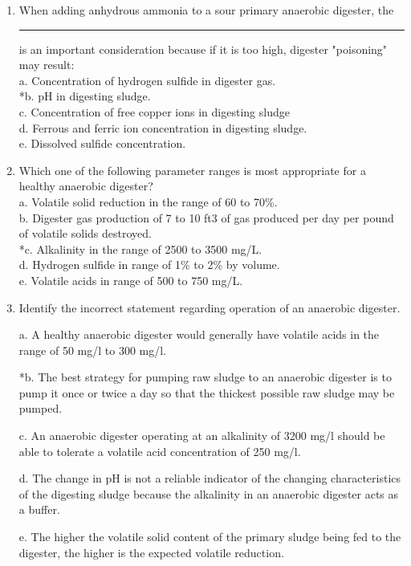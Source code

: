 \begin{enumerate}
\item  When adding anhydrous ammonia to a sour primary anaerobic digester, the\rule{1.5cm}{0.3cm} is an important consideration because if it is too high, digester "poisoning" may result: \\

a. Concentration of hydrogen sulfide in digester gas. \\
*b. pH in digesting sludge. \\
c. Concentration of free copper ions in digesting sludge \\
d. Ferrous and ferric ion concentration in digesting sludge. \\
e. Dissolved sulfide concentration. \\

\item  Which one of the following parameter ranges is most appropriate for a healthy anaerobic digester? \\

a. Volatile solid reduction in the range of 60 to 70\%. \\
b. Digester gas production of 7 to 10 ft3 of gas produced per day per pound of volatile solids destroyed. \\
*c. Alkalinity in the range of 2500 to 3500 mg/L. \\
d. Hydrogen sulfide in range of 1\% to 2\% by volume. \\
e. Volatile acids in range of 500 to 750 mg/L. \\

\item Identify the incorrect statement regarding operation of an anaerobic digester. 

a. A healthy anaerobic digester would generally have volatile acids in the range of 50 mg/l to 300 mg/l. 

*b. The best strategy for pumping raw sludge to an anaerobic digester is to pump it once or twice a day so that the thickest possible raw sludge may be pumped. 

c. An anaerobic digester operating at an alkalinity of 3200 mg/l should be able to tolerate a volatile acid concentration of 250 mg/l. 

d. The change in pH is not a reliable indicator of the changing characteristics of the digesting sludge because the alkalinity in an anaerobic digester acts as a buffer. 

e. The higher the volatile solid content of the primary sludge being fed to the digester, the higher is the expected volatile reduction. 


\end{enumerate}
